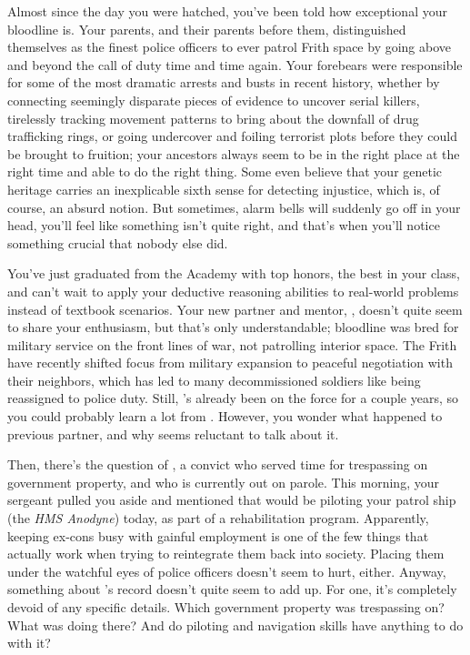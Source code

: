 \documentclass[char]{guildcamp4}
\begin{document}
\name{\cCgood{}}

Almost since the day you were hatched, you've been told how exceptional your bloodline is. Your parents, and their parents before them, distinguished themselves as the finest police officers to ever patrol Frith space by going above and beyond the call of duty time and time again. Your forebears were responsible for some of the most dramatic arrests and busts in recent history, whether by connecting seemingly disparate pieces of evidence to uncover serial killers, tirelessly tracking movement patterns to bring about the downfall of drug trafficking rings, or going undercover and foiling terrorist plots before they could be brought to fruition; your ancestors always seem to be in the right place at the right time and able to do the right thing. Some even believe that your genetic heritage carries an inexplicable sixth sense for detecting injustice, which is, of course, an absurd notion. But sometimes, alarm bells will suddenly go off in your head, you'll feel like something isn't quite right, and that's when you'll notice something crucial that nobody else did. 

You've just graduated from the Academy with top honors, the best in your class, and can't wait to apply your deductive reasoning abilities to real-world problems instead of textbook scenarios. Your new partner and mentor, \cCbad{}, doesn't quite seem to share your enthusiasm, but that's only understandable; \cCbad{\their} bloodline was bred for military service on the front lines of war, not patrolling interior space. The Frith have recently shifted focus from military expansion to peaceful negotiation with their neighbors, which has led to many decommissioned soldiers like \cCbad{} being reassigned to police duty. Still, \cCbad{\they}'s already been on the force for a couple years, so you could probably learn a lot from \cCbad{\them}. However, you wonder what happened to \cCbad{\their} previous partner, and why \cCbad{\they} seems reluctant to talk about it.

Then, there's the question of \cPilot{}, a convict who served time for trespassing on government property, and who is currently out on parole. This morning, your sergeant pulled you aside and mentioned that \cPilot{} would be piloting your patrol ship (the \emph{HMS Anodyne}) today, as part of a rehabilitation program. Apparently, keeping ex-cons busy with gainful employment is one of the few things that actually work when trying to reintegrate them back into society. Placing them under the watchful eyes of police officers doesn't seem to hurt, either. Anyway, something about \cPilot{}'s record doesn't quite seem to add up. For one, it's completely devoid of any specific details. Which government property was \cPilot{\they} trespassing on? What was \cPilot{\they} doing there? And do \cPilot{\their} piloting and navigation skills have anything to do with it?
\end{document}
